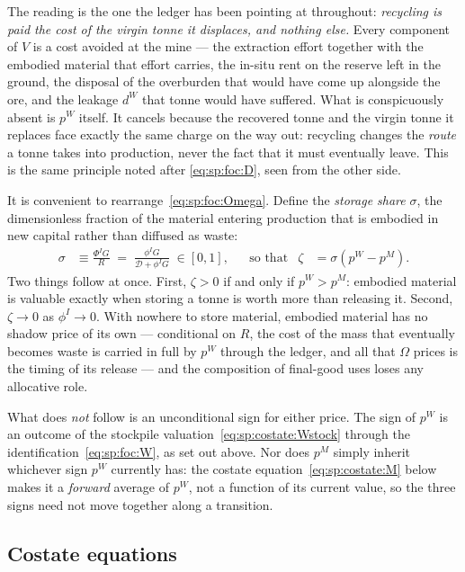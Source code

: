 The reading is the one the ledger has been pointing at throughout: \emph{recycling is paid the cost
of the virgin tonne it displaces, and nothing else.} Every component of $V$ is a cost avoided at the
mine --- the extraction effort together with the embodied material that effort carries, the in-situ
rent on the reserve left in the ground, the disposal of the overburden that would have come up
alongside the ore, and the leakage $d^W$ that tonne would have suffered. What is conspicuously
absent is $p^W$ itself. It cancels because the recovered tonne and the virgin tonne it replaces face
exactly the same charge on the way out: recycling changes the \emph{route} a tonne takes into
production, never the fact that it must eventually leave. This is the same principle noted after
\eqref{eq:sp:foc:D}, seen from the other side.


 It is convenient to rearrange~\eqref{eq:sp:foc:Omega}. Define the \emph{storage share} $\sigma$, the dimensionless fraction of the material entering production that is embodied in new capital rather than diffused as waste:
\begin{align}
\sigma &\equiv \frac{\Phi^IG}{R} \;=\; \frac{\phi^IG}{\mathcal D+\phi^IG}\;\in\left[0,1\right],
&&\text{so that}
&
\zeta &= \sigma\left(p^W-p^M\right).
\label{eq:sp:zeta-explicit}
\end{align}
Two things follow at once. First, $\zeta>0$ if and only if $p^W>p^M$: embodied material is valuable exactly when storing a tonne is worth more than releasing it. Second, $\zeta\to0$ as $\phi^I\to0$. With nowhere to store material, embodied material has no shadow price of its own --- conditional on $R$, the cost of the mass that eventually becomes waste is carried in full by $p^W$ through the ledger, and all that $\Omega$ prices is the timing of its release --- and the composition of final-good uses loses any allocative role.

What does \emph{not} follow is an unconditional sign for either price. The sign of $p^W$ is an outcome of the stockpile valuation~\eqref{eq:sp:costate:Wstock} through the identification~\eqref{eq:sp:foc:W}, as set out above. Nor does $p^M$ simply inherit whichever sign $p^W$ currently has: the costate equation~\eqref{eq:sp:costate:M} below makes it a \emph{forward} average of $p^W$, not a function of its current value, so the three signs need not move together along a transition.

\subsection{Costate equations}\label{sec:app:sp:costates}

